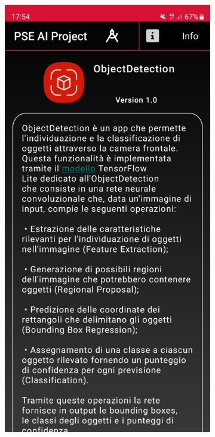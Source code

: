 \begin{figure}[ht]
    \centering
    \begin{subfigure}[b]{0.3\textwidth}
      \includegraphics[width=\textwidth, height=0.45\textheight]{Immagini/App/info_scuro.jpeg}

\end{subfigure}
\end{figure}
